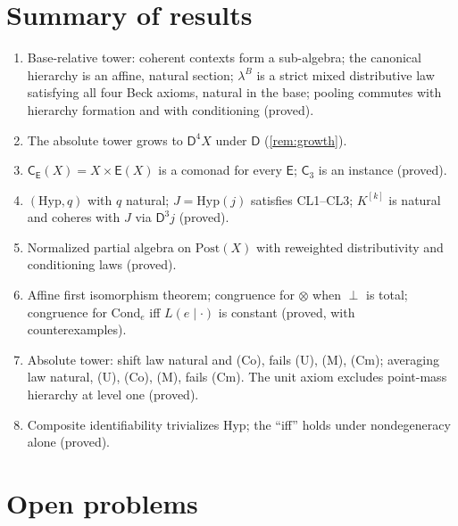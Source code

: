 \documentclass[11pt]{article}
\theoremstyle{definition}
\theoremstyle{remark}
\newcommand{\D}{\mathsf{D}}
\newcommand{\Hyp}{\mathrm{Hyp}}
\newcommand{\Post}{\mathrm{Post}}
\newcommand{\Cond}{\mathrm{Cond}}
\newcommand{\C}{\mathsf{C}}
\newcommand{\E}{\mathsf{E}}
\begin{document}
\section{Summary of results}

\begin{enumerate}[leftmargin=*]
\item Base-relative tower: coherent contexts form a sub-algebra; the canonical hierarchy is an
  affine, natural section; $\lambda^B$ is a strict mixed distributive law satisfying all four Beck
  axioms, natural in the base; pooling commutes with hierarchy formation and with conditioning
  (proved).
\item The absolute tower grows to $\D^4X$ under $\D$ (\cref{rem:growth}).
\item $\C_\E(X)=X\times\E(X)$ is a comonad for every $\E$; $\C_3$ is an instance (proved).
\item $(\Hyp,q)$ with $q$ natural; $J=\Hyp(j)$ satisfies CL1--CL3; $K^{[k]}$ is natural and coheres
  with $J$ via $\D^3j$ (proved).
\item Normalized partial algebra on $\Post(X)$ with reweighted distributivity and conditioning laws
  (proved).
\item Affine first isomorphism theorem; congruence for $\otimes$ when $\perp$ is total; congruence for
  $\Cond_e$ iff $L(e\mid\cdot)$ is constant (proved, with counterexamples).
\item Absolute tower: shift law natural and (Co), fails (U), (M), (Cm); averaging law natural,
  (U), (Co), (M), fails (Cm). The unit axiom excludes point-mass hierarchy at level one (proved).
\item Composite identifiability trivializes $\Hyp$; the ``iff'' holds under nondegeneracy alone (proved).
\end{enumerate}

\section{Open problems}
\end{document}
